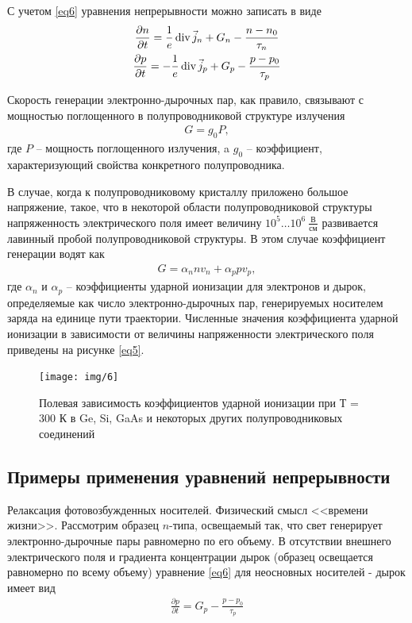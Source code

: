 С учетом \eqref{eq6} уравнения непрерывности можно записать в виде
\begin{gather}
	\label{eq7}
	\frac{\partial n}{\partial t}=\frac{1}{e} \operatorname{div} \vec{j}_{{n}}+G_{n}-\frac{n-n_{0}}{\tau_{n}}\\
	\frac{\partial p}{\partial t}=-\frac{1}{e} \operatorname{div} \vec{j}_{{p}}+G_{p}-\frac{p-p_{0}}{\tau_{p}}
\end{gather}

Скорость генерации электронно-дырочных пар, как правило, связывают с мощностью поглощенного в полупроводниковой структуре излучения
\begin{gather}
	\label{eq8}
	G=g_{0} P,
\end{gather}
где $P$ -- мощность поглощенного излучения, a $g_0$ -- коэффициент, характеризующий свойства конкретного полупроводника.

В случае, когда к полупроводниковому кристаллу приложено большое напряжение, такое, что в некоторой области полупроводниковой структуры напряженность электрического поля имеет величину $10^5\ldots10^6\ \frac{\text{В}}{\text{см}}$ развивается лавинный пробой полупроводниковой структуры. В этом случае коэффициент генерации водят как
\begin{gather}
	\label{eq9}
	G=\alpha_{n} n v_{n}+\alpha_{p} p v_{p},
\end{gather}
 где $\alpha_n$ и $\alpha_p$ -- коэффициенты ударной ионизации для электронов и дырок, определяемые как число электронно-дырочных пар, генерируемых носителем заряда на единице пути траектории. Численные значения коэффициента ударной ионизации в зависимости от величины напряженности электрического поля приведены на рисунке \ref{eq5}.

\begin{figure}[H]
	\centering
	\texttt{[image: img/6]}
	\caption{Полевая зависимость коэффициентов ударной ионизации при Т = 300 К в Ge, Si, GaAs и некоторых других полупроводниковых соединений}
	\label{fig:figure5}
\end{figure}



\subsection{Примеры применения уравнений непрерывности}

Релаксация фотовозбужденных носителей. Физический смысл <<времени жизни>>. Рассмотрим образец $n$-типа, освещаемый так, что свет генерирует электронно-дырочные пары равномерно по его объему. В отсутствии внешнего электрического поля и градиента концентрации дырок (образец освещается равномерно по всему объему) уравнение \eqref{eq6} для неосновных носителей - дырок имеет вид
\begin{gather}
	\label{eq9}
	\frac{\partial p}{\partial t}=G_{p}-\frac{p-p_{0}}{\tau_{p}}
\end{gather}

